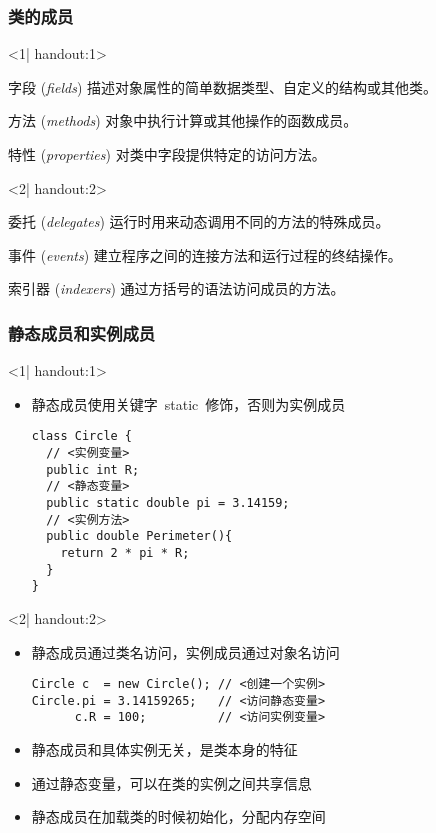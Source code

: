 \begin{frame}
\frametitle{类的成员}
\begin{onlyenv}<1| handout:1>
  \begin{block}{字段 (\textit{fields})}
    描述对象属性的简单数据类型、自定义的结构或其他类。
  \end{block}
  \begin{block}{方法 (\textit{methods})}
    对象中执行计算或其他操作的函数成员。
  \end{block}
  \begin{block}{特性 (\textit{properties})}
    对类中字段提供特定的访问方法。
  \end{block}
\end{onlyenv}
\begin{onlyenv}<2| handout:2>
  \begin{block}{委托 (\textit{delegates})}
    运行时用来动态调用不同的方法的特殊成员。
  \end{block}
  \begin{block}{事件 (\textit{events})}
    建立程序之间的连接方法和运行过程的终结操作。
  \end{block}
  \begin{block}{索引器 (\textit{indexers})}
    通过方括号的语法访问成员的方法。
  \end{block}
\end{onlyenv}
\end{frame}


\begin{frame}[fragile]
\frametitle{静态成员和实例成员}
\begin{onlyenv}<1| handout:1>
  \begin{itemize}
  \item 静态成员使用关键字~static~修饰，否则为实例成员
\begin{lstlisting}[escapeinside=<>]
class Circle {
  // <实例变量>
  public int R;
  // <静态变量>
  public static double pi = 3.14159;
  // <实例方法>
  public double Perimeter(){
    return 2 * pi * R;
  }
}
\end{lstlisting}

  \end{itemize}
\end{onlyenv}
\begin{onlyenv}<2| handout:2>
  \begin{itemize}
\setlength{\itemsep}{8pt plus 1pt}
  \item 静态成员通过类名访问，实例成员通过对象名访问
\begin{lstlisting}[escapeinside=<>]
Circle c  = new Circle(); // <创建一个实例>
Circle.pi = 3.14159265;   // <访问静态变量>
      c.R = 100;          // <访问实例变量>
\end{lstlisting}
  \item 静态成员和具体实例无关，是类本身的特征
  \item 通过静态变量，可以在类的实例之间共享信息
  \item 静态成员在加载类的时候初始化，分配内存空间
  \end{itemize}
\end{onlyenv}
\end{frame}

